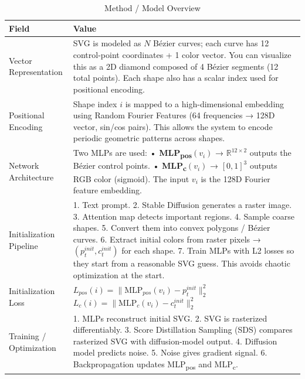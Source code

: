     \begin{table}[h!]
    \centering
    \caption{Method / Model Overview}
    \begin{tabular}{|l|p{10cm}|}
    \hline
    \textbf{Field} & \textbf{Value} \\ \hline

    Vector Representation &
    SVG is modeled as $N$ Bézier curves; each curve has 12 control-point coordinates + 1 color vector.  
    You can visualize this as a 2D diamond composed of 4 Bézier segments (12 total points).  
    Each shape also has a scalar index used for positional encoding. \\ \hline

    Positional Encoding &
    Shape index $i$ is mapped to a high-dimensional embedding using Random Fourier Features  
    (64 frequencies → 128D vector, sin/cos pairs).  
    This allows the system to encode periodic geometric patterns across shapes. \\ \hline

    Network Architecture &
    Two MLPs are used:  
    • \textbf{MLP\textsubscript{pos}}$(v_i)$ → $\mathbb{R}^{12\times 2}$ outputs the Bézier control points.  
    • \textbf{MLP\textsubscript{c}}$(v_i)$ → $[0,1]^3$ outputs RGB color (sigmoid).  
    The input $v_i$ is the 128D Fourier feature embedding. \\ \hline

    Initialization Pipeline &
    1. Text prompt.  
    2. Stable Diffusion generates a raster image.  
    3. Attention map detects important regions.  
    4. Sample coarse shapes.  
    5. Convert them into convex polygons / Bézier curves.  
    6. Extract initial colors from raster pixels → $(p_t^{init}, c_t^{init})$ for each shape.  
    7. Train MLPs with L2 losses so they start from a reasonable SVG guess.  
    This avoids chaotic optimization at the start. \\ \hline

    Initialization Loss &
    $L_{pos}(i) = \| \text{MLP}_{pos}(v_i) - p_t^{init} \|_2^2$  
    $L_{c}(i) = \| \text{MLP}_{c}(v_i) - c_t^{init} \|_2^2$ \\ \hline

    Training / Optimization &
    1. MLPs reconstruct initial SVG.  
    2. SVG is rasterized differentiably.  
    3. Score Distillation Sampling (SDS) compares rasterized SVG with diffusion-model output.  
    4. Diffusion model predicts noise.  
    5. Noise gives gradient signal.  
    6. Backpropagation updates MLP\textsubscript{pos} and MLP\textsubscript{c}. \\ \hline


\end{tabular}
\end{table}

